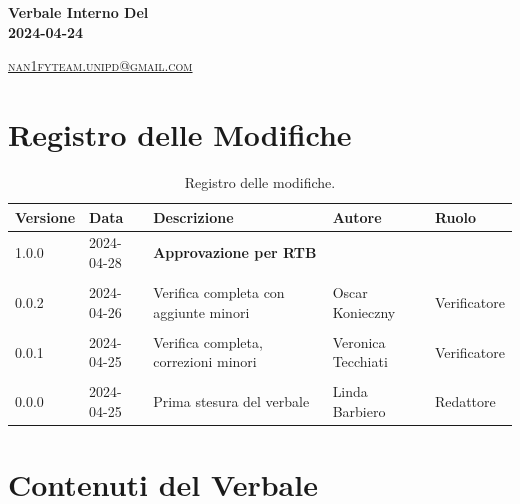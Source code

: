 \documentclass[8pt]{article}
\begin{document}
\begin{titlepage}
\begin{minipage}[t]{0.47\textwidth}
{		}
		\vspace{4mm}\vspace{4mm}
	\end{minipage}
	\vspace{4cm}
	\begin{center}
		\begin{flushright}
			{\fontsize{30pt}{52pt}\selectfont \textbf{Verbale Interno Del\\2024-04-24\\}} %
		\end{flushright}
		\vspace{3cm}
	\end{center}
	\vspace{8 cm}
	{\small \textsc{\href{mailto: nan1fyteam.unipd@gmail.com}{nan1fyteam.unipd@gmail.com}}}
\end{titlepage}
\pagestyle{mystyle}
\section*{Registro delle Modifiche}
\begin{table}[ht!]	
	\centering
	\begin{tabular}{p{1.2cm} p{2cm} p{6cm} p{3cm} p{2cm}}
		\toprule
		\textbf{Versione}& \textbf{Data} & \textbf{Descrizione} & \textbf{Autore} & \textbf{Ruolo} \\
		\midrule
  			1.0.0 & 2024-04-28 & \textbf{Approvazione per RTB} & & \\\\
			0.0.2 & 2024-04-26 & Verifica completa con aggiunte minori & Oscar Konieczny & Verificatore \\\\
			0.0.1 & 2024-04-25 & Verifica completa, correzioni minori & Veronica Tecchiati & Verificatore \\\\
			0.0.0 & 2024-04-25 & Prima stesura del verbale & Linda Barbiero & Redattore \\
		\bottomrule
	\end{tabular}
	\caption{Registro delle modifiche.}
	\label{table:Registro delle modifiche}
\end{table}
\newpage
\tableofcontents
\clearpage
\newpage
\justifying
\section{Contenuti del Verbale}
\end{document}
